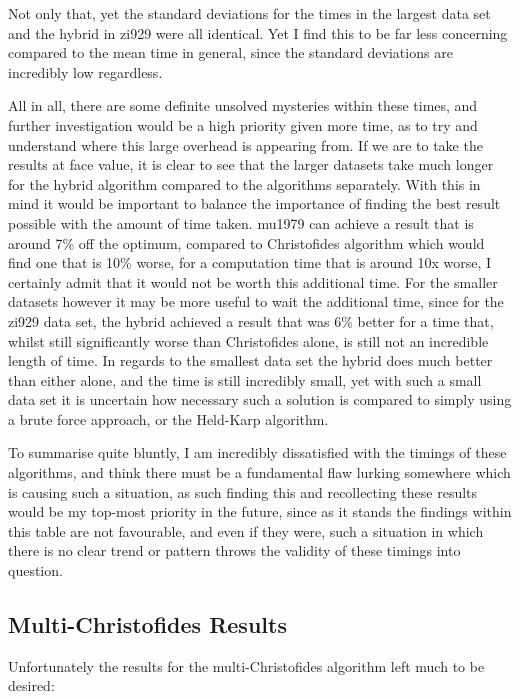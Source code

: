 \documentclass[11pt,a4paper,titlepage]{article}
\begin{document}
Not only that, yet the standard deviations for the times in the largest data set and the hybrid in zi929 were all identical. Yet I find this to be far less concerning compared to the mean time in general, since the standard deviations are incredibly low regardless.

All in all, there are some definite unsolved mysteries within these times, and further investigation would be a high priority given more time, as to try and understand where this large overhead is appearing from. If we are to take the results at face value, it is clear to see that the larger datasets take much longer for the hybrid algorithm compared to the algorithms separately. With this in mind it would be important to balance the importance of finding the best result possible with the amount of time taken. mu1979 can achieve a result that is around 7\% off the optimum, compared to Christofides algorithm which would find one that is 10\% worse, for a computation time that is around 10x worse, I certainly admit that it would not be worth this additional time. For the smaller datasets however it may be more useful to wait the additional time, since for the zi929 data set, the hybrid achieved a result that was 6\% better for a time that, whilst still significantly worse than Christofides alone, is still not an incredible length of time. In regards to the smallest data set the hybrid does much better than either alone, and the time is still incredibly small, yet with such a small data set it is uncertain how necessary such a solution is compared to simply using a brute force approach, or the Held-Karp algorithm.

To summarise quite bluntly, I am incredibly dissatisfied with the timings of these algorithms, and think there must be a fundamental flaw lurking somewhere which is causing such a situation, as such finding this and recollecting these results would be my top-most priority in the future, since as it stands the findings within this table are not favourable, and even if they were, such a situation in which there is no clear trend or pattern throws the validity of these timings into question.

\subsection{Multi-Christofides Results}

Unfortunately the results for the multi-Christofides algorithm left much to be desired:
\end{document}

